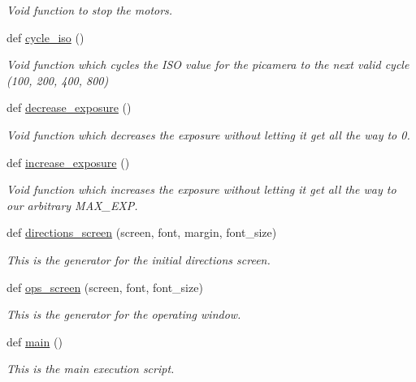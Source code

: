 \begin{DoxyCompactItemize}
\begin{DoxyCompactList}\small\item\em Void function to stop the motors. \end{DoxyCompactList}\item 
def \hyperlink{namespacefocus_aa9bf3f199d1bf68a1e49ec229dcf8c38}{cycle\+\_\+iso} ()
\begin{DoxyCompactList}\small\item\em Void function which cycles the I\+SO value for the picamera to the next valid cycle (100, 200, 400, 800) \end{DoxyCompactList}\item 
def \hyperlink{namespacefocus_a8fb78b10ef91e414ac6707d45fcd0e5b}{decrease\+\_\+exposure} ()
\begin{DoxyCompactList}\small\item\em Void function which decreases the exposure without letting it get all the way to 0. \end{DoxyCompactList}\item 
def \hyperlink{namespacefocus_a4dd9a598e7bc093873342c129ba80c98}{increase\+\_\+exposure} ()
\begin{DoxyCompactList}\small\item\em Void function which increases the exposure without letting it get all the way to our arbitrary M\+A\+X\+\_\+\+E\+XP. \end{DoxyCompactList}\item 
def \hyperlink{namespacefocus_a7c48f36dcbc8deec93ed615925469176}{directions\+\_\+screen} (screen, font, margin, font\+\_\+size)
\begin{DoxyCompactList}\small\item\em This is the generator for the initial directions screen. \end{DoxyCompactList}\item 
def \hyperlink{namespacefocus_a30f8dfb1f7d958ee49491a2e359ea3e2}{ops\+\_\+screen} (screen, font, font\+\_\+size)
\begin{DoxyCompactList}\small\item\em This is the generator for the operating window. \end{DoxyCompactList}\item 
def \hyperlink{namespacefocus_a813bbce9c83fa23eae05039332cf3d8a}{main} ()
\begin{DoxyCompactList}\small\item\em This is the main execution script. \end{DoxyCompactList}\end{DoxyCompactItemize}
